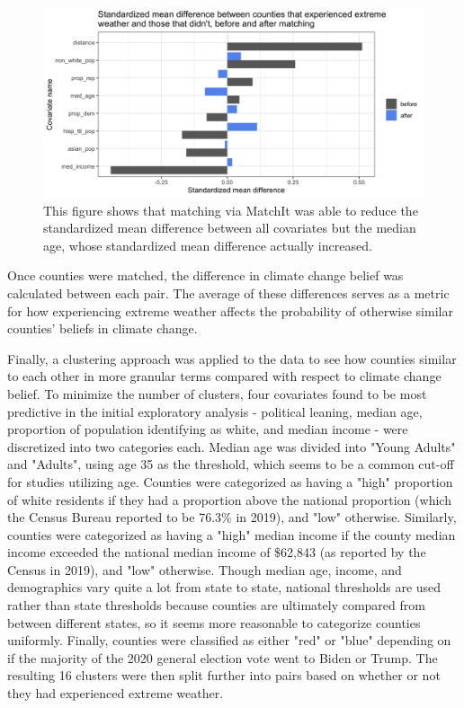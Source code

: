 \documentclass{article}
\begin{document}
\begin{figure}[H]
\centering
\includegraphics[scale = 0.2]{images/matching_balance_plot.png}
\caption{This figure shows that matching via MatchIt was able to reduce the standardized mean difference between all covariates but the median age, whose standardized mean difference actually increased.}
\end{figure}

Once counties were matched, the difference in climate change belief was calculated between each pair. The average of these differences serves as a metric for how experiencing extreme weather affects the probability of otherwise similar counties' beliefs in climate change.

Finally, a clustering approach was applied to the data to see how counties similar to each other in more granular terms compared with respect to climate change belief. To minimize the number of clusters, four covariates found to be most predictive in the initial exploratory analysis - political leaning, median age, proportion of population identifying as white, and median income - were discretized into two categories each. Median age was divided into "Young Adults" and "Adults", using age 35 as the threshold, which seems to be a common cut-off for studies utilizing age. Counties were categorized as having a "high" proportion of white residents if they had a proportion above the national proportion (which the Census Bureau reported to be 76.3\% in 2019),  and "low" otherwise. Similarly, counties were categorized as having a "high" median income if the county median income exceeded the national median income of \$62,843 (as reported by the Census in 2019), and "low" otherwise. Though median age, income, and demographics vary quite a lot from state to state, national thresholds are used rather than state thresholds because counties are ultimately compared from between different states, so it seems more reasonable to categorize counties uniformly. Finally, counties were classified as either "red" or "blue" depending on if the majority of the 2020 general election vote went to Biden or Trump. The resulting 16 clusters were then split further into pairs based on whether or not they had experienced extreme weather.
\end{document}

